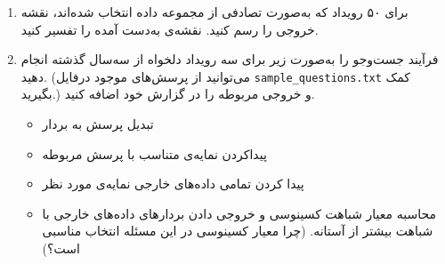 \begin{enumerate}
	
	
	
	
	\item برای ۵۰ رویداد که به‌صورت تصادفی از مجموعه داده انتخاب شده‌اند، نقشه خروجی را رسم کنید. نقشه‌ی به‌دست آمده را تفسیر کنید.
	
	
	
	\item فرآیند جست‌و‌جو را به‌صورت زیر برای سه رویداد دلخواه از سه‌سال گذشته انجام دهید. (می‌توانید از پرسش‌های موجود درفایل \texttt{sample\_questions.txt} کمک بگیرید.) و خروجی مربوطه را در گزارش خود اضافه کنید.
	
	\begin{itemize}
		\item تبدیل پرسش به بردار
		\item پیداکردن نمایه‌ی متناسب با پرسش مربوطه
		\item پیدا کردن تمامی داده‌های خارجی نمایه‌ی مورد نظر
		\item محاسبه معیار شباهت کسینوسی و خروجی دادن بردار‌های داده‌های خارجی با شباهت بیشتر از آستانه. (چرا معیار کسینوسی در این مسئله انتخاب مناسبی است؟)
	\end{itemize}
\end{enumerate}



